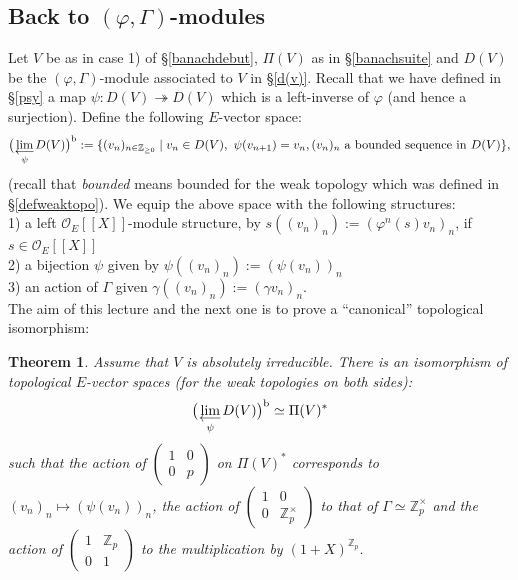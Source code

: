 \documentclass[11pt]{amsart}
\def\limproj{\mathop{\oalign{{\rm lim}\cr 
\hidewidth$\longleftarrow$\hidewidth\cr}}}
\def\Z{{\mathbb Z}_p}
\def\O{{\mathcal O}_E}
\newtheorem{thm}[definit]{\bf{Theorem}}
\begin{document}
\subsection{Back to $(\varphi,\Gamma)$-modules}\label{back1} 
 
Let $V$ be as in case 1) of \S\ref{banachdebut}, $\Pi(V)$ as in \S\ref{banachsuite} and  
$D(V)$ be the $(\varphi,\Gamma)$-module associated to $V$ in \S\ref{d(v)}. Recall that we 
have defined in \S\ref{psy} a map $\psi:D(V)\twoheadrightarrow D(V)$ which is a 
left-inverse of $\varphi$ (and hence a surjection).   
Define the following $E$-vector space: 
\begin{multline*} 
\big(\limproj_{\psi}D(V)\big)^{\rm b} 
:=\{(v_n)_{n\in{\mathbb Z}_{\geq 0}}\mid v_n\in D(V),\ \psi(v_{n+1})=v_n, 
(v_n)_n{\rm\ a\ bounded\ sequence\ in\ } D(V)\}, 
\end{multline*} 
(recall that \emph{bounded} means bounded for the weak topology which 
was defined in \S\ref{defweaktopo}). 
We equip the above space with the following structures:\\ 
1) a left $\O[[X]]$-module structure, by  
$s((v_n)_n):=(\varphi^n(s)v_n)_n$, if $s \in \O[[X]]$\\ 
2) a bijection $\psi$ given by $\psi((v_n)_n):=(\psi(v_n))_n$\\ 
3) an action of $\Gamma$ given $\gamma((v_n)_n):=(\gamma v_n)_n$.\\ 
 
The aim of this lecture and the next one is to  
prove a ``canonical'' topological isomorphism: 
\begin{thm}\label{main} 
Assume that $V$ is absolutely irreducible. There is an  
isomorphism of topological $E$-vector spaces (for  
the weak topologies on both sides): 
$$\big(\limproj_{\psi}D(V)\big)^{\rm b}\simeq \Pi(V)^*$$ 
such that the action of $\begin{pmatrix}1&0\\0&p\end{pmatrix}$ on  
$\Pi(V)^*$ corresponds to $(v_n)_n\mapsto (\psi(v_n))_n$, the action  
of $\begin{pmatrix}1&0\\0&\Z^{\times}\end{pmatrix}$ to that of  
$\Gamma\simeq \Z^{\times}$ and the action of  
$\begin{pmatrix}1&\Z\\0&1\end{pmatrix}$  
to the multiplication by $(1+X)^{\Z}$. 
\end{thm} 
 
\end{document}

